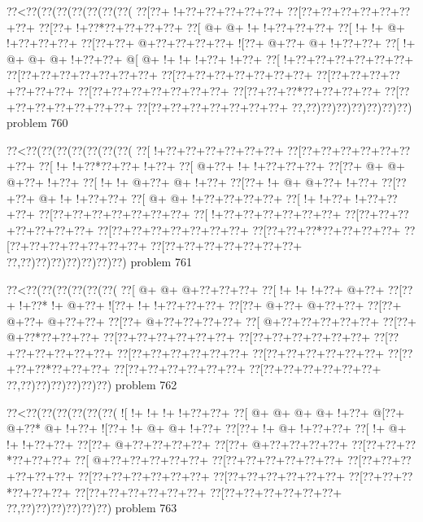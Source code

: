 \vbox{\vbox{\goo
\0??<\0??(\0??(\0??(\0??(\0??(\0??(\0??(
\0??[\0??+\- !+\0??+\0??+\0??+\0??+\0??+
\0??[\0??+\0??+\0??+\0??+\0??+\0??+\0??+
\0??[\0??+\- !+\0??*\0??+\0??+\0??+\0??+
\0??[\- @+\- @+\- !+\- !+\0??+\0??+\0??+
\0??[\- !+\- !+\- @+\- !+\0??+\0??+\0??+
\0??[\0??+\0??+\- @+\0??+\0??+\0??+\0??+
\- ![\0??+\- @+\0??+\- @+\- !+\0??+\0??+
\0??[\- !+\- @+\- @+\- @+\- !+\0??+\0??+
\- @[\- @+\- !+\- !+\- !+\0??+\- !+\0??+
\0??[\- !+\0??+\0??+\0??+\0??+\0??+\0??+
\0??[\0??+\0??+\0??+\0??+\0??+\0??+\0??+
\0??[\0??+\0??+\0??+\0??+\0??+\0??+\0??+
\0??[\0??+\0??+\0??+\0??+\0??+\0??+\0??+
\0??[\0??+\0??+\0??+\0??+\0??+\0??+\0??+
\0??[\0??+\0??+\0??*\0??+\0??+\0??+\0??+
\0??[\0??+\0??+\0??+\0??+\0??+\0??+\0??+
\0??[\0??+\0??+\0??+\0??+\0??+\0??+\0??+
\0??,\0??)\0??)\0??)\0??)\0??)\0??)\0??)
}
\hfil problem 760\hfil\break
}

\vbox{\vbox{\goo
\0??<\0??(\0??(\0??(\0??(\0??(\0??(\0??(
\0??[\- !+\0??+\0??+\0??+\0??+\0??+\0??+
\0??[\0??+\0??+\0??+\0??+\0??+\0??+\0??+
\0??[\- !+\- !+\0??*\0??+\0??+\- !+\0??+
\0??[\- @+\0??+\- !+\- !+\0??+\0??+\0??+
\0??[\0??+\- @+\- @+\- @+\0??+\- !+\0??+
\0??[\- !+\- !+\- @+\0??+\- @+\- !+\0??+
\0??[\0??+\- !+\- @+\- @+\0??+\- !+\0??+
\0??[\0??+\0??+\- @+\- !+\- !+\0??+\0??+
\0??[\- @+\- @+\- !+\0??+\0??+\0??+\0??+
\0??[\- !+\- !+\0??+\- !+\0??+\0??+\0??+
\0??[\0??+\0??+\0??+\0??+\0??+\0??+\0??+
\0??[\- !+\0??+\0??+\0??+\0??+\0??+\0??+
\0??[\0??+\0??+\0??+\0??+\0??+\0??+\0??+
\0??[\0??+\0??+\0??+\0??+\0??+\0??+\0??+
\0??[\0??+\0??+\0??*\0??+\0??+\0??+\0??+
\0??[\0??+\0??+\0??+\0??+\0??+\0??+\0??+
\0??[\0??+\0??+\0??+\0??+\0??+\0??+\0??+
\0??,\0??)\0??)\0??)\0??)\0??)\0??)\0??)
}
\hfil problem 761\hfil\break
}

\vbox{\vbox{\goo
\0??<\0??(\0??(\0??(\0??(\0??(\0??(
\0??[\- @+\- @+\- @+\0??+\0??+\0??+
\0??[\- !+\- !+\- !+\0??+\- @+\0??+
\0??[\0??+\- !+\0??*\- !+\- @+\0??+
\- ![\0??+\- !+\- !+\0??+\0??+\0??+
\0??[\0??+\- @+\0??+\- @+\0??+\0??+
\0??[\0??+\- @+\0??+\- @+\0??+\0??+
\0??[\0??+\- @+\0??+\0??+\0??+\0??+
\0??[\- @+\0??+\0??+\0??+\0??+\0??+
\0??[\0??+\- @+\0??*\0??+\0??+\0??+
\0??[\0??+\0??+\0??+\0??+\0??+\0??+
\0??[\0??+\0??+\0??+\0??+\0??+\0??+
\0??[\0??+\0??+\0??+\0??+\0??+\0??+
\0??[\0??+\0??+\0??+\0??+\0??+\0??+
\0??[\0??+\0??+\0??+\0??+\0??+\0??+
\0??[\0??+\0??+\0??*\0??+\0??+\0??+
\0??[\0??+\0??+\0??+\0??+\0??+\0??+
\0??[\0??+\0??+\0??+\0??+\0??+\0??+
\0??,\0??)\0??)\0??)\0??)\0??)\0??)
}
\hfil problem 762\hfil\break
}

\vbox{\vbox{\goo
\0??<\0??(\0??(\0??(\0??(\0??(\0??(
\- ![\- !+\- !+\- !+\- !+\0??+\0??+
\0??[\- @+\- @+\- @+\- @+\- !+\0??+
\- @[\0??+\- @+\0??*\- @+\- !+\0??+
\- ![\0??+\- !+\- @+\- @+\- !+\0??+
\0??[\0??+\- !+\- @+\- !+\0??+\0??+
\0??[\- !+\- @+\- !+\- !+\0??+\0??+
\0??[\0??+\- @+\0??+\0??+\0??+\0??+
\0??[\0??+\- @+\0??+\0??+\0??+\0??+
\0??[\0??+\0??+\0??*\0??+\0??+\0??+
\0??[\- @+\0??+\0??+\0??+\0??+\0??+
\0??[\0??+\0??+\0??+\0??+\0??+\0??+
\0??[\0??+\0??+\0??+\0??+\0??+\0??+
\0??[\0??+\0??+\0??+\0??+\0??+\0??+
\0??[\0??+\0??+\0??+\0??+\0??+\0??+
\0??[\0??+\0??+\0??*\0??+\0??+\0??+
\0??[\0??+\0??+\0??+\0??+\0??+\0??+
\0??[\0??+\0??+\0??+\0??+\0??+\0??+
\0??,\0??)\0??)\0??)\0??)\0??)\0??)
}
\hfil problem 763\hfil\break
}

